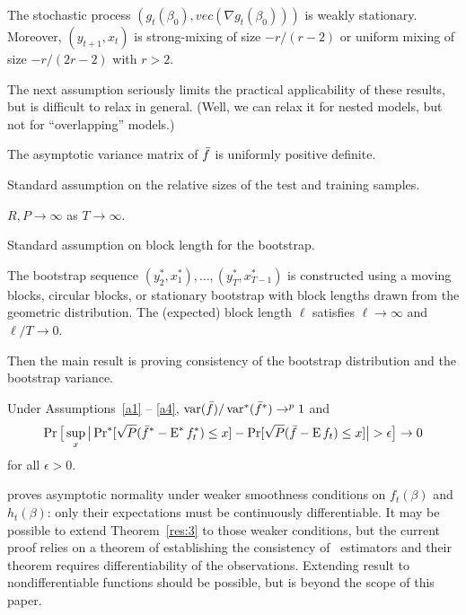 \documentclass[12pt,fleqn]{article}
\begin{document}
\begin{asmp}\label{a3}
  The stochastic process $(g_t(\beta_0), vec(\nabla g_t(\beta_0)))$ is
  weakly stationary. Moreover, $(y_{t+1},x_t)$ is strong-mixing of
  size $-r/(r-2)$ or uniform mixing of size $-r/(2r-2)$ with $r>2$.
\end{asmp}

The next assumption seriously limits the practical applicability of
these results, but is difficult to relax in general. (Well, we can
relax it for nested models, but not for ``overlapping'' models.)

\begin{asmp}\label{a6}
  The asymptotic variance matrix of $\bar f$ is uniformly positive definite.
\end{asmp}

Standard assumption on the relative sizes of the test and training samples.

\begin{asmp}\label{a7}
  $R, P \to \infty$ as $T \to \infty$.
\end{asmp}

Standard assumption on block length for the bootstrap.

\begin{asmp}\label{a4}
  The bootstrap sequence $(y_2^*, x_1^*),\dots,(y_T^*, x_{T-1}^*)$ is
  constructed using a moving blocks, circular blocks, or stationary
  bootstrap with block lengths drawn from the geometric distribution.
  The (expected) block length $\ell$ satisfies $\ell \to \infty$
  and $\ell/T \to 0$.
\end{asmp}

Then the main result is proving consistency of the bootstrap
distribution and the bootstrap variance.

\begin{thm}\label{res:3}
  Under Assumptions~\ref{a1} -- \ref{a4}, $\operatorname{var}(\bar f)/\operatorname{var}^*(\bar f^*)
  \to^p 1$ and
  \begin{equation}\label{eq:15}
    \operatorname{Pr}\big[\sup_x \big\lvert \operatorname{Pr}^*[\sqrt{P} (\bar f^* - \operatorname{E}^* f_t^*) \leq x]
    - \operatorname{Pr}[\sqrt{P}( \bar{f} - \operatorname{E} f_t) \leq x] \big\rvert > \epsilon\big] \to 0
  \end{equation}
  for all $\epsilon > 0$.
\end{thm}

\begin{rem}
  \citet{Mcc:00} proves asymptotic normality under weaker smoothness
  conditions on $f_t(\beta)$ and $h_t(\beta)$: only their expectations
  must be continuously differentiable.  It may be possible to extend
  Theorem~\ref{res:3} to those weaker conditions, but the current
  proof relies on a theorem of  establishing the
  consistency of \hac\ estimators and their theorem requires differentiability of
  the observations.  Extending  result to
  nondifferentiable functions should be possible, but is beyond the
  scope of this paper.
\end{rem}
\end{document}

